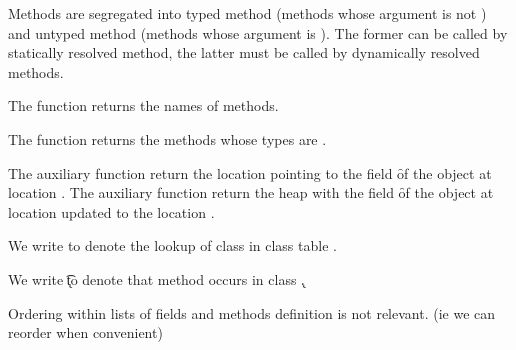 \documentclass[a4paper,USenglish]{tex/lipics-v2016}
\begin{document}
Methods are segregated into typed method (methods whose argument is not
\any) and untyped method (methods whose argument is \any). The former can be
called by statically resolved method, the latter must be called by
dynamically resolved methods.

The function \names{} returns the names of methods. 

The function \untyped{} returns the methods whose types are \any.

The auxiliary function  return the location \ap pointing to the
field \f of the object at location \a. The auxiliary function 
return the heap \sp with the field \f of the object at location \a updated
to the location \ap.

We write \App\K\C to denote the lookup of class \C in class table \K.

We write  \Mdef\m\x\t\tp\e \In \k to denote that method \m occurs in class \k.

Ordering within lists of fields and methods definition is not relevant. (ie we can reorder when convenient)
\end{document}

